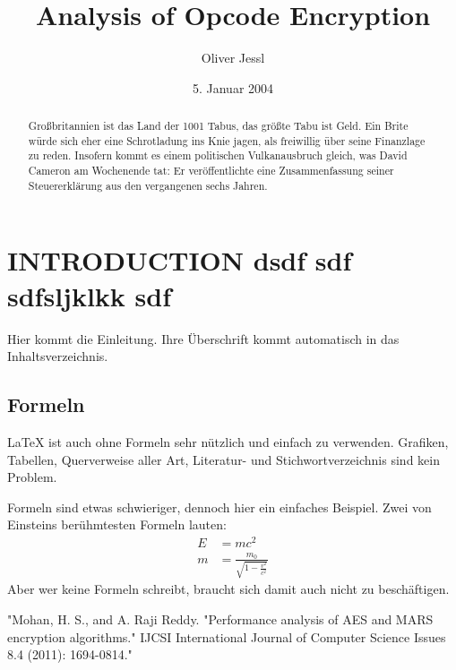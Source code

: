 \documentclass[11pt]{scrartcl}
\title{Analysis of Opcode Encryption}
\date{5. Januar 2004}
\author{Oliver Jessl}
\begin{document}
\maketitle
\tableofcontents





\begin{abstract}
Großbritannien ist das Land der 1001 Tabus, das größte Tabu ist Geld. Ein Brite würde sich eher eine Schrotladung ins Knie jagen, als freiwillig über seine Finanzlage zu reden. Insofern kommt es einem politischen Vulkanausbruch gleich, was David Cameron am Wochenende tat: Er veröffentlichte eine Zusammenfassung seiner Steuererklärung aus den vergangenen sechs Jahren.
\end{abstract}


\section{INTRODUCTION dsdf sdf sdfsljklkk sdf}

Hier kommt die Einleitung. Ihre Überschrift kommt
automatisch in das Inhaltsverzeichnis.

\subsection{Formeln}

\LaTeX{} ist auch ohne Formeln \cite{paamea} sehr nützlich und
einfach zu verwenden. Grafiken, Tabellen,
Querverweise aller Art, Literatur- und
Stichwortverzeichnis sind kein Problem.

Formeln sind etwas schwieriger, dennoch hier ein
einfaches Beispiel.  Zwei von Einsteins
berühmtesten Formeln lauten:
\begin{align}
E &= mc^2                                  \\
m &= \frac{m_0}{\sqrt{1-\frac{v^2}{c^2}}}
\end{align}
Aber wer keine Formeln schreibt, braucht sich
damit auch nicht zu beschäftigen.


\begin{thebibliography}{laengste Labelbreite}
   "Mohan, H. S., and A. Raji Reddy. "Performance analysis of AES and MARS encryption algorithms." IJCSI International Journal of Computer Science Issues 8.4 (2011): 1694-0814."
\end{thebibliography}
\end{document}

